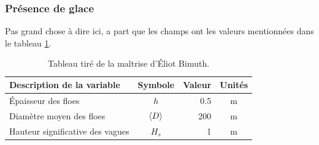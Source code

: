 \documentclass[10pt]{article}
\numberwithin{equation}{section}
\begin{document}
\subsubsection{Présence de glace}
\label{sec:orgef44bf7}

Pas grand chose à dire ici, a part que les champs ont les valeurs mentionnées dans le tableau \ref{tab:org7fbccd4}.

\begin{table}[!h]
\caption{\label{tab:org7fbccd4}Tableau tiré de la maîtrise d'Éliot Bimuth.}
\centering
\begin{tabular}{lcrc}
\hline
\hline
Description de la variable & Symbole & Valeur & Unités\\
\hline
Épaisseur des floes & \(h\) & 0.5 & m\\
Diamètre moyen des floes & \(\expval{D}\) & 200 & m\\
Hauteur significative des vagues & \(H_s\) & 1 & m\\
\hline
\end{tabular}
\end{table}


\printbibliography
\end{document}
